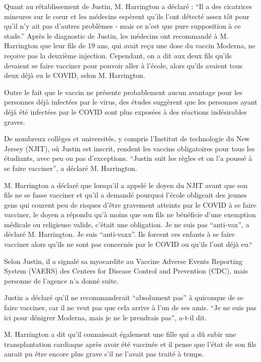{Quant au rétablissement de Justin, M. Harrington a déclaré : “Il a des
cicatrices mineures sur le cœur et les médecins espèrent qu'ils l'ont détecté
assez tôt pour qu'il n'y ait pas d'autres problèmes - mais ce n'est que pure
supposition à ce stade.” Après le diagnostic de Justin, les médecins ont
recommandé à M. Harrington que leur fils de 19 ans, qui avait reçu une dose du
vaccin Moderna, ne reçoive pas la deuxième injection. Cependant, on a dit aux
deux fils qu'ils devaient se faire vacciner pour pouvoir aller à l'école, alors
qu'ils avaient tous deux déjà eu le COVID, selon M. Harrington.

Outre le fait que le vaccin ne présente probablement aucun avantage pour les
personnes déjà infectées par le virus, des études suggèrent que les personnes
ayant déjà été infectées par le COVID sont plus exposées à des réactions
indésirables graves.

De nombreux collèges et universités, y compris l'Institut de technologie du New
Jersey (NJIT), où Justin est inscrit, rendent les vaccins obligatoires pour tous
les étudiants, avec peu ou pas d'exceptions. “Justin suit les règles et on l'a
poussé à se faire vacciner”, a déclaré M. Harrington.

M. Harrington a déclaré que lorsqu'il a appelé le doyen du NJIT avant que son
fils ne se fasse vacciner et qu'il a demandé pourquoi l'école obligeait des
jeunes gens qui courent peu de risques d'être gravement atteints par le COVID à
se faire vacciner, le doyen a répondu qu'à moins que son fils ne bénéficie d'une
exemption médicale ou religieuse valide, c'était une obligation. Je ne suis pas
“anti-vax”, a déclaré M. Harrington. Je suis “anti-vaxx”. Ils forcent ces
enfants à se faire vacciner alors qu'ils ne sont pas concernés par le COVID ou
qu'ils l'ont déjà eu.“

Selon Justin, il a signalé sa myocardite au Vaccine Adverse Events Reporting
System (VAERS) des Centers for Disease Control and Prevention (CDC), mais
personne de l'agence n'a donné suite.

Justin a déclaré qu'il ne recommanderait “absolument pas” à quiconque de se
faire vacciner, car il ne veut pas que cela arrive à l'un de ses amis. “Je ne
suis pas ici pour dénigrer Moderna, mais je ne le prendrais pas”, a-t-il dit.

M. Harrington a dit qu'il connaissait également une fille qui a dû subir une
transplantation cardiaque après avoir été vaccinée et il pense que l'état de son
fils aurait pu être encore plus grave s'il ne l'avait pas traité à temps.

}
